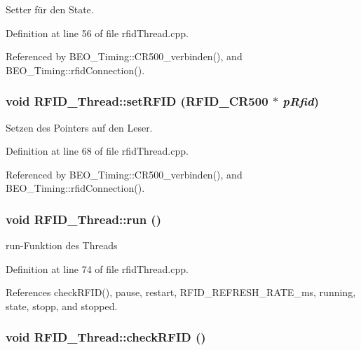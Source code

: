 Setter für den State. 



Definition at line 56 of file rfidThread.cpp.

Referenced by BEO\_\-Timing::CR500\_\-verbinden(), and BEO\_\-Timing::rfidConnection().\hypertarget{class_r_f_i_d___thread_1c13017995a135d84c7eac183a93fd6e}{
\subsubsection[setRFID]{\setlength{\rightskip}{0pt plus 5cm}void RFID\_\-Thread::setRFID ({\bf RFID\_\-CR500} $\ast$ {\em pRfid})}}
\label{class_r_f_i_d___thread_1c13017995a135d84c7eac183a93fd6e}


Setzen des Pointers auf den Leser. 



Definition at line 68 of file rfidThread.cpp.

Referenced by BEO\_\-Timing::CR500\_\-verbinden(), and BEO\_\-Timing::rfidConnection().\hypertarget{class_r_f_i_d___thread_185320343182f6cbbd076d9088bcb3c4}{
\subsubsection[run]{\setlength{\rightskip}{0pt plus 5cm}void RFID\_\-Thread::run ()}}
\label{class_r_f_i_d___thread_185320343182f6cbbd076d9088bcb3c4}


run-Funktion des Threads 



Definition at line 74 of file rfidThread.cpp.

References checkRFID(), pause, restart, RFID\_\-REFRESH\_\-RATE\_\-ms, running, state, stopp, and stopped.\hypertarget{class_r_f_i_d___thread_9ad5963abb159cabb61ef91a201ffdfa}{
\subsubsection[checkRFID]{\setlength{\rightskip}{0pt plus 5cm}void RFID\_\-Thread::checkRFID ()}}
\label{class_r_f_i_d___thread_9ad5963abb159cabb61ef91a201ffdfa}




